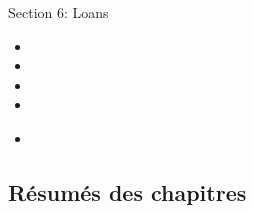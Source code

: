 \begin{ASM_chapter}
Section 6: Loans
\begin{itemize}
	\item	{}
	\item	{}
	\item	{}
	\item	{}
\end{itemize}
\end{ASM_chapter}

\begin{YTB_vids}
\begin{itemize}
	\item	
\end{itemize}
\end{YTB_vids}

\subsection{Résumés des chapitres}


